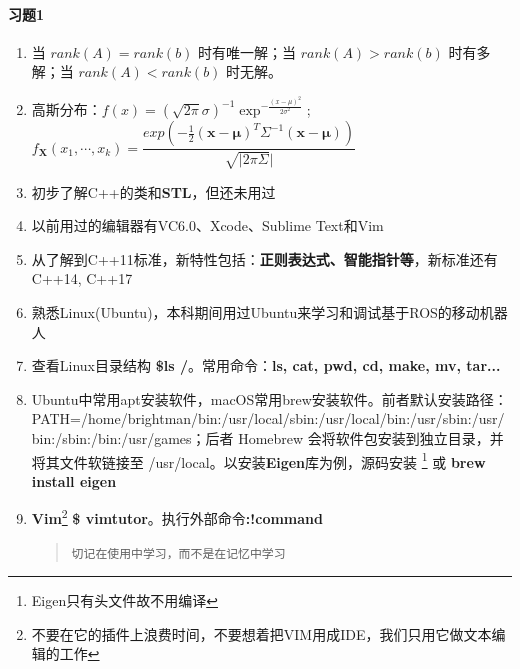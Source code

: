 \documentclass[12pt,a4paper]{ctexart}
\author{张吉祥}
\begin{document}
\paragraph{习题1}
\begin{enumerate}
	\item 当 $ rank(A) = rank(b) $ 时有唯一解；当 $ rank(A) > rank(b) $ 时有多解；当 $ rank(A) < rank(b) $ 时无解。
	\item 高斯分布：$ f(x)=(\sqrt{2\pi}\sigma)^{-1}\exp^{-\frac{(x-\mu)^{2}}{2\sigma^{2}}} $; $ f_{\mathbf{X}}(x_{1},\cdots,x_{k})=\dfrac{exp(-\frac{1}{2}(\mathbf{x}-\mathbf{\mu})^{T}\Sigma^{-1}(\mathbf{x}-\mathbf{\mu}))}{\sqrt{|2\pi\Sigma}|} $
	\item 初步了解C++的类和\textbf{STL}，但还未用过
	\item 以前用过的编辑器有VC6.0、Xcode、Sublime Text和Vim
	\item 从\cite{Lippman2012}了解到C++11标准，新特性包括：\textbf{正则表达式、智能指针等}，新标准还有C++14, C++17
	\item 熟悉Linux(Ubuntu)，本科期间用过Ubuntu来学习和调试基于ROS的移动机器人
	\item 查看Linux目录结构 \textbf{\$ls /}。常用命令：\textbf{ls, cat, pwd, cd, make, mv, tar...}
	\item Ubuntu中常用apt安装软件，macOS常用brew安装软件。前者默认安装路径：PATH=/home/brightman/bin:/usr/local/sbin:/usr/local/bin:/usr/sbin:/usr/bin:/sbin:/bin:/usr/games；后者 Homebrew 会将软件包安装到独立目录，并将其文件软链接至 /usr/local。以安装\textbf{Eigen}库为例，源码安装 \footnote{Eigen只有头文件故不用编译} 或 \textbf{brew install eigen}
	\item \textbf{Vim}\footnote{不要在它的插件上浪费时间，不要想着把VIM用成IDE，我们只用它做文本编辑的工作} \textbf{\$ vimtutor}。执行外部命令\textbf{:!command}
	\begin{quote}
		\texttt{切记在使用中学习，而不是在记忆中学习}
	\end{quote}
\end{enumerate}
\end{document}
